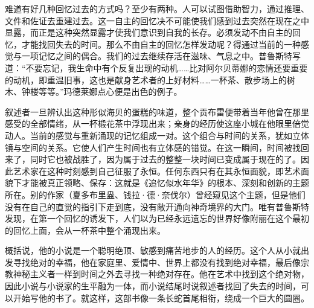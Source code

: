 \par 难道有好几种回忆过去的方式吗？至少有两种。人可以试图借助智力，通过推理、文件和佐证去重建过去。这一自主的回忆决不可能使我们感到过去突然在现在之中显露，而正是这种突然显露才使我们意识到自我的长存。必须发动不由自主的回忆，才能找回失去的时间。那么不由自主的回忆怎样发动呢？得通过当前的一种感觉与一项记忆之间的偶合。我们的过去继续存活在滋味、气息之中。普鲁斯特写道：“不要忘记，我生命中有个反复出现的动机……比对阿尔贝蒂娜的恋情还要重要的动机，即重温旧事，这也是献身艺术者的上好材料……一杯茶、散步场上的树木、钟楼等等。”玛德莱娜点心便是出色的例子。
\par 叙述者一旦辨认出这种形似海贝的蛋糕的味道，整个贡布雷便带着当年他曾在那里感受的全部情绪，从一杯椴花茶中浮现出来；亲身的经历使这座小城在他眼里倍觉动人。当前的感觉与重新涌现的记忆组成一对。这个组合与时间的关系，犹如立体镜与空间的关系。它使人们产生时间也有立体感的错觉。在这一瞬间，时间被找回来了，同时它也被战胜了，因为属于过去的整整一块时间已变成属于现在的了。因此艺术家在这种时刻感到自己征服了永恒。任何东西只有在其永恒面貌，即艺术面貌下才能被真正领略、保存：这就是《追忆似水年华》的根本、深刻和创新的主题所在。别的作家（夏多布里盎、钱拉·德·奈伐尔）曾经窥见这个主题，但是他们没有在自己的直觉的指引下走到底，没有敞开通向神奇境界的大门。唯有普鲁斯特发现，在第一个回忆的诱发下，人们以为已经永远遗忘的世界好像附丽在这个最初的回忆上面，会从一杯茶中整个涌现出来。
\par 概括说，他的小说是一个聪明绝顶、敏感到痛苦地步的人的经历。这个人从小就出发寻找绝对的幸福，他在家庭里、爱情中、世界上都没有找到绝对幸福，最后像宗教神秘主义者一样到时间之外去寻找一种绝对存在。他在艺术中找到这个绝对物，因此小说与小说家的生平融为一体，而小说结尾时说叙述者找回了失去的时间，可以开始写他的书了。就这样，这部书像一条长蛇首尾相衔，绕成一个巨大的圆圈。
